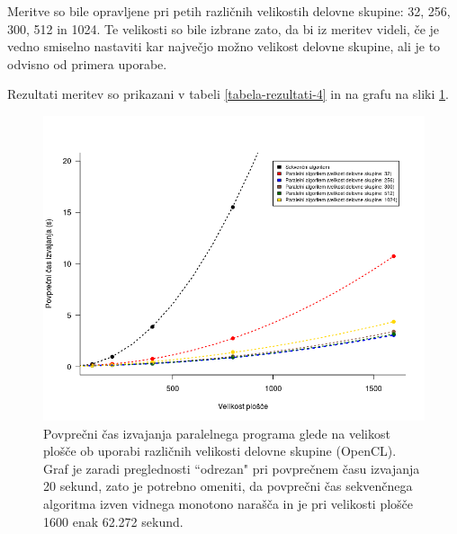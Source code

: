 \documentclass[a4paper,titlepage,11pt]{article}
\begin{document}
Meritve so bile opravljene pri petih različnih velikostih delovne skupine: 32, 256, 300, 512 in 1024. Te velikosti so bile izbrane zato, da bi iz meritev videli, če je vedno smiselno nastaviti kar največjo možno velikost delovne skupine, ali je to odvisno od primera uporabe.

Rezultati meritev so prikazani v tabeli \ref{tabela-rezultati-4} in na grafu na sliki \ref{graf-rezultati-4}.

\begin{figure}[H]
\begin{center}
\includegraphics[scale=0.5]{graf-rezultati-4_1.png}
\caption{Povprečni čas izvajanja paralelnega programa glede na velikost plošče ob uporabi različnih velikosti delovne skupine (OpenCL). Graf je zaradi preglednosti ``odrezan" pri povprečnem času izvajanja 20 sekund, zato je potrebno omeniti, da povprečni čas sekvenčnega algoritma izven vidnega monotono narašča in je pri velikosti plošče 1600 enak 62.272 sekund.}
\label{graf-rezultati-4}
\end{center}
\vspace{-25pt}
\end{figure}
\end{document}
